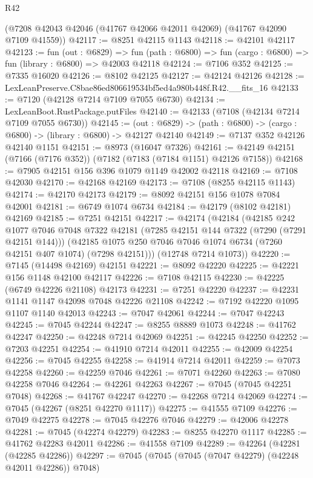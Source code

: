 \begin{lexlean}{R42}
\begin{coremodule}
{    (@7208 @42043 @42046 (@41767 @42066 @42011 @42069) (@41767 @42090 @7109 @41559))
@42117 := @8251 @42115 @1143
@42118 := @42101 @42117
@42123 := fun (out : @6829) =>
  fun (path : @6800) => fun (cargo : @6800) => fun (library : @6800) => @42003 @42118
@42124 := @7106 @352
@42125 := @7335 @16020
@42126 := @8102 @42125
@42127 := @42124 @42126
@42128 := LexLeanPreserve.C8bae86ed806619534bf5ed4a980b448f.R42.__fits_16
@42133 := @7120 (@42128 @7214 @7109 @7055 @6730)
@42134 := LexLeanBoot.RustPackage.putFiles
@42140 := @42133 (@7108 (@42134 @7214 @7109 @7055 @6730))
@42145 := (out : @6829) -> (path : @6800) -> (cargo : @6800) -> (library : @6800) -> @42127 @42140
@42149 := @7137 @352 @42126 @42140 @1151
@42151 := @8973 (@16047 @7326)
@42161 := @42149 @42151 (@7166 (@7176 @352)) (@7182 (@7183 (@7184 @1151) @42126 @7158))
@42168 := @7905 @42151 @156 @396 @1079 @1149 @42002 @42118
@42169 := @7108 @42030
@42170 := @42168 @42169
@42173 := @7108 (@8255 @42115 @1143)
@42174 := @42170 @42173
@42179 := @8092 @42151 @156 @1078 @7084 @42001
@42181 := @6749 @1074 @6734
@42184 := @42179 (@8102 @42181) @42169
@42185 := @7251 @42151
@42217 := @42174
    (@42184
      (@42185
        @242
        @1077
        @7046
        @7048
        @7322
        @42181
        (@7285 @42151 @144 @7322 (@7290 (@7291 @42151 @144)))
        (@42185 @1075 @250 @7046 @7046 @1074 @6734 (@7260 @42151 @407 @1074) (@7298 @42151)))
      (@12748 @7214 @1073))
@42220 := @7145 (@14498 @42169) @42151
@42221 := @8092 @42220
@42225 := @42221 @156 @1148 @42100 @42117
@42226 := @7108 @42115
@42230 := @42225 (@6749 @42226 @21108) @42173
@42231 := @7251 @42220
@42237 := @42231 @1141 @1147 @42098 @7048 @42226 @21108
@42242 := @7192 @42220 @1095 @1107 @1140 @42013
@42243 := @7047 @42061
@42244 := @7047 @42243
@42245 := @7045 @42244
@42247 := @8255 @8889 @1073
@42248 := @41762 @42247
@42250 := @42248 @7214 @42069
@42251 := @42245 @42250
@42252 := @7203 @42251
@42254 := @41910 @7214 @42011
@42255 := @42009 @42254
@42256 := @7045 @42255
@42258 := @41914 @7214 @42011
@42259 := @7073 @42258
@42260 := @42259 @7046
@42261 := @7071 @42260
@42263 := @7080 @42258 @7046
@42264 := @42261 @42263
@42267 := @7045 (@7045 @42251 @7048)
@42268 := @41767 @42247
@42270 := @42268 @7214 @42069
@42274 := @7045 (@42267 (@8251 @42270 @1117))
@42275 := @41555 @7109
@42276 := @7049 @42275
@42278 := @7045 @42276 @7046
@42279 := @42006 @42278
@42281 := @7045 (@42274 @42279)
@42283 := @8255 @42270 @1117
@42285 := @41762 @42283 @42011
@42286 := @41558 @7109
@42289 := @42264 (@42281 (@42285 @42286))
@42297 := @7045 (@7045 (@7045 (@7047 @42279) (@42248 @42011 @42286)) @7048)
}
\end{coremodule}
\end{lexlean}
